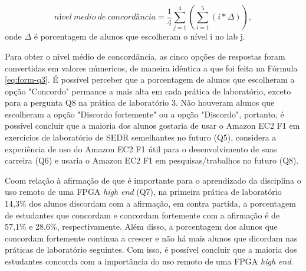 \begin{equation}\label{eq:form-q4-q5-q6-q7-q8}
   nível \ medio \ de \ concordância = \frac{1}{4}\sum_{j=1}^{4} (\sum_{i=1}^{5} (i*\Delta)),
\end{equation}
onde $\Delta$ é porcentagem de alunos que escolheram o nível i no lab j.




\begin{figure}[htb!] 
   	    \captionsetup{width=15cm}%
\end{figure}

Para obter o nível médio de concordância, as cinco opções de respostas foram convertidas em valores númericos, de maneira idêntica a que foi feita na Fórmula \ref{eq:form-q3}. É possível perceber que a porcentagem de alunos que escolheram a opção "Concordo" permance a mais alta em cada prática de laboratório, exceto para a pergunta Q8 na prática de laboratório 3. Não houveram alunos que escolheram a opção "Discordo fortemente" ou a opção "Discordo", portanto, é possível concluir que a maioria dos alunos  gostaria de usar o Amazon EC2 F1 em exercícios de laboratório de SEDR semelhantes no futuro (Q5), considera a experiência de uso do Amazon EC2 F1  útil para o desenvolvimento de suas carreira (Q6) e usaria o Amazon EC2 F1 em pesquisas/trabalhos no futuro (Q8).

Coom relação à afirmação de que é importante para o aprendizado da disciplina o uso remoto de uma FPGA \textit{high end} (Q7), na primeira prática de laboratório 14,3\% dos alunos discordam com a afirmação, em contra partida, a porcentagem de estudantes que concordam  e concordam fortemente com a afirmação é de 57,1\% e 28,6\%, respectivamente. Além disso, a porcentagem dos alunos que concordam fortemente continua a crescer e não há mais alunos que dicordam nas práticas de laboratório seguintes. Com isso, é possível concluir que a maioria dos estudantes concorda com a importância do uso remoto de uma FPGA  \textit{high end}. 

